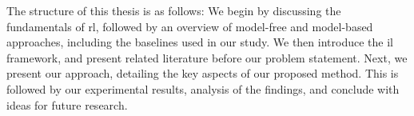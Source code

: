The structure of this thesis is as follows: We begin by discussing the fundamentals of \ac{rl}, followed by an overview of model-free and model-based approaches, 
including the baselines used in our study. We then introduce the \ac{il} framework, and present related literature before our problem statement. 
Next, we present our approach, detailing the key aspects of our proposed method. This is followed by our experimental results, analysis of the findings, and conclude with ideas for future research.